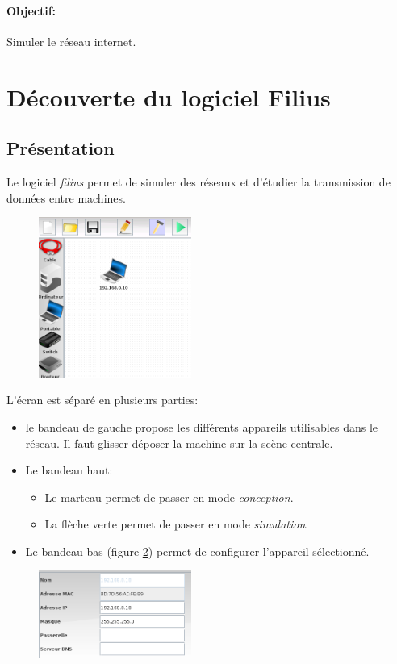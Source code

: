 \documentclass[a4paper,11pt]{article}
\begin{document}
\begin{Form}
\paragraph{Objectif:}Simuler le réseau internet.
\section{Découverte du logiciel Filius}
\subsection{Présentation}
Le logiciel \emph{filius} permet de simuler des réseaux et d'étudier la transmission de données entre machines.
\begin{figure}[!h]
\centering
\includegraphics[width=5cm]{ressources/filius-ecran.png}
\label{filius}
\end{figure}
L'écran est séparé en plusieurs parties:
\begin{itemize}
\item le bandeau de gauche propose les différents appareils utilisables dans le réseau. Il faut glisser-déposer la machine sur la scène centrale.
\item Le bandeau haut:
\begin{itemize}
\item Le marteau permet de passer en mode \emph{conception}.
\item La flèche verte permet de passer en mode \emph{simulation}.
\end{itemize}
\item Le bandeau bas (figure \ref{config}) permet de configurer l'appareil sélectionné.
\end{itemize}
\begin{figure}[!h]
\centering
\includegraphics[width=5cm]{ressources/config-pc.png}
\label{config}
\end{figure}

\end{Form}
\end{document}
